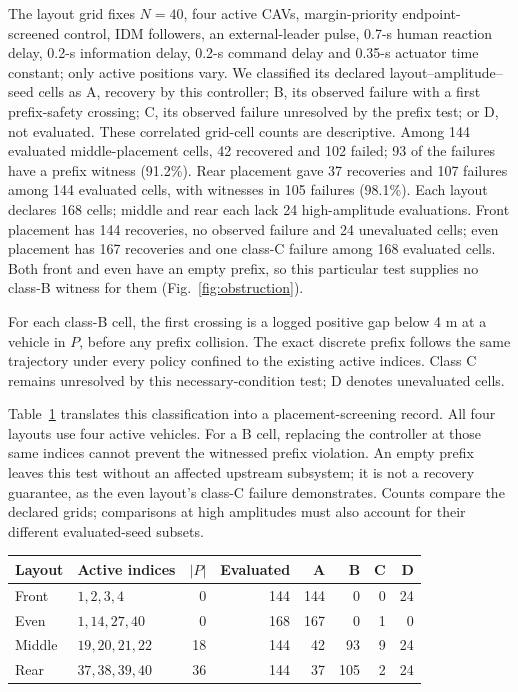 \documentclass[12pt]{article}
\begin{document}
The layout grid fixes $N=40$, four active CAVs, margin-priority endpoint-screened control, IDM followers, an external-leader pulse, 0.7-s human reaction delay, 0.2-s information delay, 0.2-s command delay and 0.35-s actuator time constant; only active positions vary. We classified its declared layout--amplitude--seed cells as A, recovery by this controller; B, its observed failure with a first prefix-safety crossing; C, its observed failure unresolved by the prefix test; or D, not evaluated. These correlated grid-cell counts are descriptive. Among 144 evaluated middle-placement cells, 42 recovered and 102 failed; 93 of the failures have a prefix witness (91.2\%). Rear placement gave 37 recoveries and 107 failures among 144 evaluated cells, with witnesses in 105 failures (98.1\%). Each layout declares 168 cells; middle and rear each lack 24 high-amplitude evaluations. Front placement has 144 recoveries, no observed failure and 24 unevaluated cells; even placement has 167 recoveries and one class-C failure among 168 evaluated cells. Both front and even have an empty prefix, so this particular test supplies no class-B witness for them (Fig.~\ref{fig:obstruction}).

For each class-B cell, the first crossing is a logged positive gap below 4 m at a vehicle in $P$, before any prefix collision. The exact discrete prefix follows the same trajectory under every policy confined to the existing active indices. Class C remains unresolved by this necessary-condition test; D denotes unevaluated cells.

Table~\ref{tab:placement} translates this classification into a placement-screening record. All four layouts use four active vehicles. For a B cell, replacing the controller at those same indices cannot prevent the witnessed prefix violation. An empty prefix leaves this test without an affected upstream subsystem; it is not a recovery guarantee, as the even layout's class-C failure demonstrates. Counts compare the declared grids; comparisons at high amplitudes must also account for their different evaluated-seed subsets.

\begin{table}[H]\centering\small
{}\label{tab:placement}
\par{}\par
\begin{tabular}{@{}l l r r r r r r@{}}\toprule
Layout & Active indices & $|P|$ & Evaluated & A & B & C & D\\\midrule
Front & $1,2,3,4$ & 0 & 144 & 144 & 0 & 0 & 24\\
Even & $1,14,27,40$ & 0 & 168 & 167 & 0 & 1 & 0\\
Middle & $19,20,21,22$ & 18 & 144 & 42 & 93 & 9 & 24\\
Rear & $37,38,39,40$ & 36 & 144 & 37 & 105 & 2 & 24\\\bottomrule
\end{tabular}
\end{table}
\end{document}
